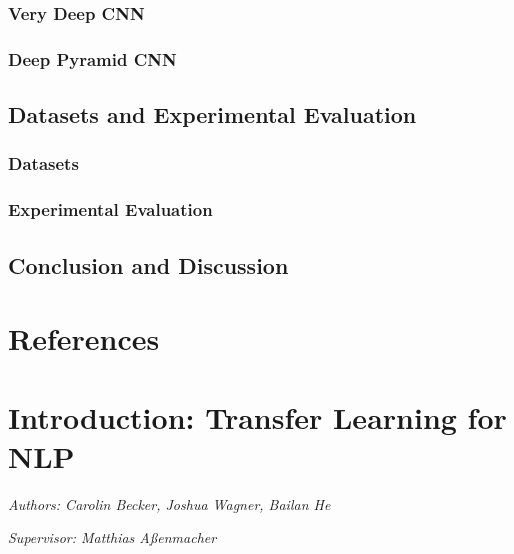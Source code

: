 \documentclass[]{krantz}
\begin{document}
\hypertarget{very-deep-cnn}{%
\subsection{Very Deep CNN}\label{very-deep-cnn}}

\hypertarget{deep-pyramid-cnn}{%
\subsection{Deep Pyramid CNN}\label{deep-pyramid-cnn}}

\hypertarget{datasets-and-experimental-evaluation}{%
\section{Datasets and Experimental Evaluation}\label{datasets-and-experimental-evaluation}}

\hypertarget{datasets}{%
\subsection{Datasets}\label{datasets}}

\hypertarget{experimental-evaluation}{%
\subsection{Experimental Evaluation}\label{experimental-evaluation}}

\hypertarget{conclusion-and-discussion}{%
\section{Conclusion and Discussion}\label{conclusion-and-discussion}}

\hypertarget{references}{%
\chapter{References}\label{references}}

\hypertarget{introduction-transfer-learning-for-nlp}{%
\chapter{Introduction: Transfer Learning for NLP}\label{introduction-transfer-learning-for-nlp}}

\emph{Authors: Carolin Becker, Joshua Wagner, Bailan He}

\emph{Supervisor: Matthias Aßenmacher}
\end{document}
